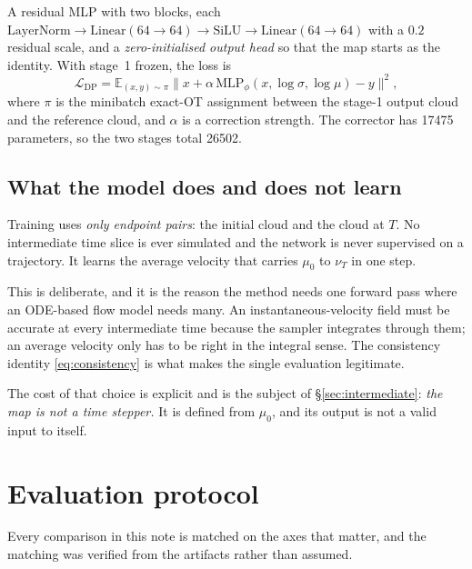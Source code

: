 ﻿\documentclass[11pt,a4paper]{article}
\begin{document}
A residual MLP with two blocks, each
$\mathrm{LayerNorm}\to\mathrm{Linear}(64\to64)\to\mathrm{SiLU}\to\mathrm{Linear}(64\to64)$ with a
$0.2$ residual scale, and a \emph{zero-initialised output head} so that the map starts as the
identity. With stage~1 frozen, the loss is
\begin{equation}
\mathcal{L}_{\text{DP}}
=\mathbb{E}_{(x,y)\sim\pi}\Big\|x+\alpha\,\mathrm{MLP}_\phi(x,\log\sigma,\log\mu)-y\Big\|^2,
\label{eq:dp-loss}
\end{equation}
where $\pi$ is the minibatch exact-OT assignment between the stage-1 output cloud and the
reference cloud, and $\alpha$ is a correction strength. The corrector has \num{17475}
parameters, so the two stages total \num{26502}.

\subsection{What the model does and does not learn}

Training uses \emph{only endpoint pairs}: the initial cloud and the cloud at $T$. No
intermediate time slice is ever simulated and the network is never supervised on a trajectory.
It learns the average velocity that carries $\mu_0$ to $\nu_T$ in one step.

This is deliberate, and it is the reason the method needs one forward pass where an ODE-based
flow model needs many. An instantaneous-velocity field must be accurate at every intermediate
time because the sampler integrates through them; an average velocity only has to be right in
the integral sense. The consistency identity \eqref{eq:consistency} is what makes the single
evaluation legitimate.

The cost of that choice is explicit and is the subject of \S\ref{sec:intermediate}: \emph{the
map is not a time stepper.} It is defined from $\mu_0$, and its output is not a valid input to
itself.

\section{Evaluation protocol}

Every comparison in this note is matched on the axes that matter, and the matching was verified
from the artifacts rather than assumed.
\end{document}
